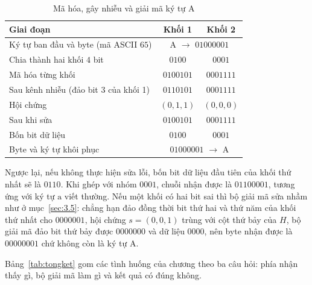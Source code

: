 \begin{table}[H]
\centering\small\renewcommand{\arraystretch}{1.1}
\caption{Mã hóa, gây nhiễu và giải mã ký tự A}
\label{tab:kytuA}
\begin{tabular}{|l|c|c|}
\hline
\textbf{Giai đoạn} & \textbf{Khối 1} & \textbf{Khối 2}\\ \hline
Ký tự ban đầu và byte (mã ASCII $65$) & \multicolumn{2}{c|}{A $\to$ $01000001$}\\ \hline
Chia thành hai khối $4$ bit & $0100$ & $0001$\\ \hline
Mã hóa từng khối & $0100101$ & $0001111$\\ \hline
Sau kênh nhiễu (đảo bit $3$ của khối 1) & $0110101$ & $0001111$\\ \hline
Hội chứng & $(0,1,1)$ & $(0,0,0)$\\ \hline
Sau khi sửa & $0100101$ & $0001111$\\ \hline
Bốn bit dữ liệu & $0100$ & $0001$\\ \hline
Byte và ký tự khôi phục & \multicolumn{2}{c|}{$01000001$ $\to$ A}\\ \hline
\end{tabular}
\end{table}

Ngược lại, nếu không thực hiện sửa lỗi, bốn bit dữ liệu đầu tiên của khối thứ
nhất sẽ là $0110$. Khi ghép với nhóm $0001$, chuỗi nhận được là $01100001$,
tương ứng với ký tự $\mathrm{a}$ viết thường. Nếu một khối có hai bit sai thì bộ
giải mã
sửa nhầm như ở mục~\ref{sec:3.5}: chẳng hạn đảo đồng thời bit thứ hai và thứ năm
của khối thứ nhất cho $0000001$, hội chứng $s = (0,0,1)$ trùng với cột thứ bảy
của $H$, bộ giải mã đảo bit thứ bảy được $0000000$ và dữ liệu $0000$, nên byte
nhận được là $00000001$ chứ không còn là ký tự $\mathrm{A}$.

Bảng~\ref{tab:tongket} gom các tình huống của chương theo ba câu hỏi: phía nhận
thấy gì, bộ giải mã làm gì và kết quả có đúng không.

